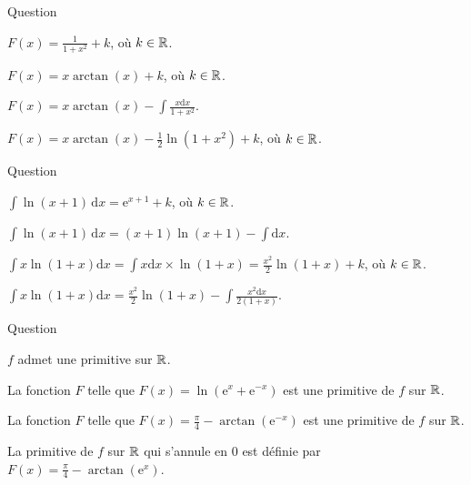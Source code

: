 \begin{multi}[multiple,feedback=
{Une intégration par parties avec \(u=\arctan (x)\) et \(v=x\) donne
\[\int \arctan (x)\mathrm{d}x=x\arctan (x)-\int \frac{x\mathrm{d}x}{1+x^2}=x\arctan (x)-\frac{1}{2}\ln (1+x^2)+k,\; k\in \Rr.\]
}]{Question}
    \item \(\displaystyle F(x)=\frac{1}{1+x^2}+k\), où \(k\in \mathbb{R}\).
    \item \(\displaystyle F(x)=x\arctan (x)+k\), où \(k\in \mathbb{R}\).
    \item* \(\displaystyle F(x)=x\arctan (x)-\int \frac{x\mathrm{d}x}{1+x^2}\).
    \item* \(\displaystyle F(x)=x\arctan (x)-\frac{1}{2}\ln (1+x^2)+k\), où \(k\in \mathbb{R}\).
\end{multi}


\begin{multi}[multiple,feedback=
{Une intégration par parties avec \(u=\ln (x+1)\) et \(v=x+1\) donne
\[\int \ln (x+1)\, \mathrm{d}x=(x+1)\ln (x+1)-\int \mathrm{d}x=(x+1)\ln (x+1)-x+k,\; k\in \Rr.\]
Une intégration par parties avec \(u=\ln (x+1)\) et \(v=x^2/2\) donne
\[\int x\ln (1+x)\mathrm{d}x=\frac{x^2}{2}\ln (1+x)-\int \frac{x^2\mathrm{d}x}{2(1+x)}.\]
}]{Question}
    \item \(\displaystyle \int \ln (x+1)\, \mathrm{d}x=\mathrm{e}^{x+1}+k\), où \(k\in \mathbb{R}\).
    \item* \(\displaystyle \int \ln (x+1)\, \mathrm{d}x=(x+1)\ln (x+1)-\int \mathrm{d}x\).
    \item \(\displaystyle \int x\ln (1+x)\mathrm{d}x=\int x\mathrm{d}x\times\ln (1+x)=\frac{x^2}{2}\ln (1+x)+k\), où \(k\in \mathbb{R}\).
    \item* \(\displaystyle \int x\ln (1+x)\mathrm{d}x=\frac{x^2}{2}\ln (1+x)-\int \frac{x^2\mathrm{d}x}{2(1+x)}\).
\end{multi}


\begin{multi}[multiple,feedback=
{La fonction \(f\) est continue sur \(\Rr\), donc elle y admet des primitives. Avec \(t=\mathrm{e}^{-x}\), on a : \(\mathrm{d}t=-\mathrm{e}^{-x}\, \mathrm{d}x\) et
\[\int \frac{\mathrm{d}x}{\mathrm{e}^x+\mathrm{e}^{-x}}=\int \frac{\mathrm{e}^{-x}\, \mathrm{d}x}{1+\mathrm{e}^{-2x}}=-\int \frac{\mathrm{d}t}{1+t^2}=-\arctan (t)+k=-\arctan \left(\mathrm{e}^{-x}\right)+k,\; k\in \Rr.\]
La condition \(F(0)=0\) implique que \(\displaystyle k=\frac{\pi}{4}\).
}]{Question}
    \item* \(f\) admet une primitive sur \(\Rr\).
    \item La fonction \(F\) telle que \(\displaystyle F(x)=\ln \left(\mathrm{e}^x+\mathrm{e}^{-x}\right)\) est une primitive de \(f\) sur \(\Rr\).
    \item* La fonction \(F\) telle que \(\displaystyle F(x)=\frac{\pi}{4}-\arctan \left(\mathrm{e}^{-x}\right)\) est une primitive de \(f\) sur \(\Rr\).
    \item La primitive de \(f\) sur \(\Rr\) qui s'annule en \(0\) est d\'efinie par \(\displaystyle F(x)=\frac{\pi}{4}-\arctan \left(\mathrm{e}^{x}\right)\).
\end{multi}


